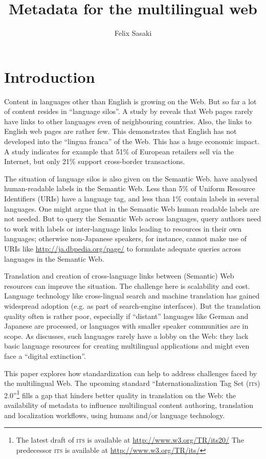 \documentclass[output=paper]{LSP/langsci}
\author{Felix Sasaki \affiliation{\textsc{dfki} and \textsc{w\oldstylenums{3}c} Fellow} }
\title{Metadata for the multilingual web}
\begin{document}

\section{Introduction}\label{sec:sasaki:1} 


Content in languages other than English is growing on the Web. But so far a lot of content resides in ``language silos''. A study by \citet{Ford11} reveals that Web pages rarely have links to other languages even of neighbouring countries. Also, the links to English web pages are rather few. This demonstrates that English has not developed into the ``lingua franca'' of the Web. This has a huge economic impact. A  \citet{FlashEurobarometer2011} study indicates for example that 51\% of European retailers sell via the Internet, but only 21\% support cross-border transactions.


The situation of language silos is also given on the Semantic Web. \citet{EllEtAl2011} have analysed human-readable labels in the Semantic Web. Less than 5\% of Uniform Resource Identifiers (\textsc{URI}s) have a language tag, and less than 1\% contain labels in several languages. One might argue that in the Semantic Web human readable labels are not needed. But to query the Semantic Web across languages, query authors need to work with labels or inter-language links leading to resources in their own languages; otherwise non-Japanese speakers, for instance, cannot make use of \textsc{URI}s like 
\href{http://ja.dbpedia.org/page/講談社}{http://ja.dbpedia.org/page/} 
to formulate adequate queries across languages in the Semantic Web. 

Translation and creation of cross-language links between (Semantic) Web resources can improve the situation. The challenge here is scalability and cost. Language technology like cross-lingual search and machine translation has gained widespread adoption (e.g. as part of search-engine interfaces). But the translation quality often is rather poor, especially if ``distant'' languages like German and Japanese are processed, or languages with smaller speaker communities are in scope. As \citet{Kornai2012} discusses, such languages rarely have a lobby on the Web: they lack basic language resources for creating multilingual applications and might even face a ``digital extinction''.

This paper explores how standardization can help to address challenges faced by the multilingual Web. The upcoming standard ``Internationalization Tag Set (\textsc{its}) 2.0''\footnote{The latest draft of \textsc{its } is available at \url{http://www.w3.org/TR/its20/}  The predecessor \textsc{its } is available at \url{http://www.w3.org/TR/its/}} fills a gap that hinders better quality in translation on the Web: the availability of metadata to influence multilingual content authoring, translation and localization workflows, using humans and\slash or language technology.
\end{document}
